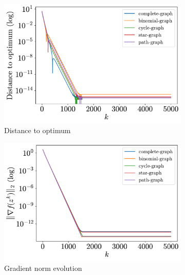 \documentclass[a4paper,11pt,oneside]{book}
\begin{document}
\begin{figure}[tb!]
      \centering
      \begin{subfigure}[t]{0.46\linewidth}
            \centering
            \includegraphics[width=\linewidth]{./figs/quadratic/5_3/distance.pdf} 
            \caption{Distance to optimum}
      \end{subfigure}
      \hfill
      \begin{subfigure}[t]{0.46\linewidth}
            \centering
            \includegraphics[width=\linewidth]{./figs/quadratic/5_3/gradient.pdf} 
            \caption{Gradient norm evolution}
      \end{subfigure}
      \hfill
      \begin{subfigure}[t]{0.46\linewidth}
            \centering

\end{subfigure}
\end{figure}
\end{document}
